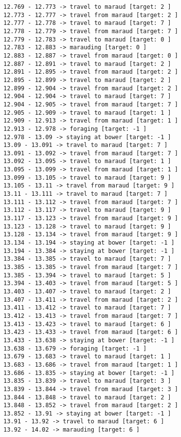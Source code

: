 \documentclass[11pt]{article}
\begin{document}
\begin{Verbatim}[commandchars=\\\{\}]
12.769 - 12.773 -> travel to maraud [target: 2 ]
12.773 - 12.777 -> travel from maraud [target: 2 ]
12.777 - 12.778 -> travel to maraud [target: 7 ]
12.778 - 12.779 -> travel from maraud [target: 7 ]
12.779 - 12.783 -> travel to maraud [target: 0 ]
12.783 - 12.883 -> marauding [target: 0 ]
12.883 - 12.887 -> travel from maraud [target: 0 ]
12.887 - 12.891 -> travel to maraud [target: 2 ]
12.891 - 12.895 -> travel from maraud [target: 2 ]
12.895 - 12.899 -> travel to maraud [target: 2 ]
12.899 - 12.904 -> travel from maraud [target: 2 ]
12.904 - 12.904 -> travel to maraud [target: 7 ]
12.904 - 12.905 -> travel from maraud [target: 7 ]
12.905 - 12.909 -> travel to maraud [target: 1 ]
12.909 - 12.913 -> travel from maraud [target: 1 ]
12.913 - 12.978 -> foraging [target: -1 ]
12.978 - 13.09 -> staying at bower [target: -1 ]
13.09 - 13.091 -> travel to maraud [target: 7 ]
13.091 - 13.092 -> travel from maraud [target: 7 ]
13.092 - 13.095 -> travel to maraud [target: 1 ]
13.095 - 13.099 -> travel from maraud [target: 1 ]
13.099 - 13.105 -> travel to maraud [target: 9 ]
13.105 - 13.11 -> travel from maraud [target: 9 ]
13.11 - 13.111 -> travel to maraud [target: 7 ]
13.111 - 13.112 -> travel from maraud [target: 7 ]
13.112 - 13.117 -> travel to maraud [target: 9 ]
13.117 - 13.123 -> travel from maraud [target: 9 ]
13.123 - 13.128 -> travel to maraud [target: 9 ]
13.128 - 13.134 -> travel from maraud [target: 9 ]
13.134 - 13.194 -> staying at bower [target: -1 ]
13.194 - 13.384 -> staying at bower [target: -1 ]
13.384 - 13.385 -> travel to maraud [target: 7 ]
13.385 - 13.385 -> travel from maraud [target: 7 ]
13.385 - 13.394 -> travel to maraud [target: 5 ]
13.394 - 13.403 -> travel from maraud [target: 5 ]
13.403 - 13.407 -> travel to maraud [target: 2 ]
13.407 - 13.411 -> travel from maraud [target: 2 ]
13.411 - 13.412 -> travel to maraud [target: 7 ]
13.412 - 13.413 -> travel from maraud [target: 7 ]
13.413 - 13.423 -> travel to maraud [target: 6 ]
13.423 - 13.433 -> travel from maraud [target: 6 ]
13.433 - 13.638 -> staying at bower [target: -1 ]
13.638 - 13.679 -> foraging [target: -1 ]
13.679 - 13.683 -> travel to maraud [target: 1 ]
13.683 - 13.686 -> travel from maraud [target: 1 ]
13.686 - 13.835 -> staying at bower [target: -1 ]
13.835 - 13.839 -> travel to maraud [target: 3 ]
13.839 - 13.844 -> travel from maraud [target: 3 ]
13.844 - 13.848 -> travel to maraud [target: 2 ]
13.848 - 13.852 -> travel from maraud [target: 2 ]
13.852 - 13.91 -> staying at bower [target: -1 ]
13.91 - 13.92 -> travel to maraud [target: 6 ]
13.92 - 14.02 -> marauding [target: 6 ]

\end{Verbatim}
\end{document}
